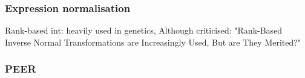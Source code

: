 
\subsubsection{Expression normalisation}

Rank-based int:
heavily used in genetics, 
    Although criticised: "Rank-Based Inverse Normal Transformations are Increasingly Used, But are They Merited?"

\subsubsection{PEER}


